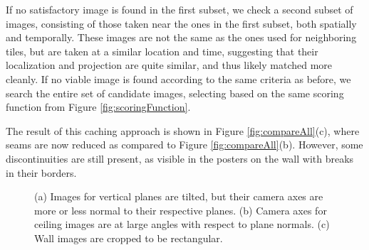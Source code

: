 \documentclass[]{spie}  %
\begin{document}
If no satisfactory image is found in the first subset, we check a
second subset of images, consisting of those taken near the ones in
the first subset, both spatially and temporally. These images are not
the same as the ones used for neighboring tiles, but are taken at a
similar location and time, suggesting that their localization and
projection are quite similar, and thus likely matched more cleanly. If
no viable image is found according to the same criteria as before, we
search the entire set of candidate images, selecting based on the same
scoring function from Figure \ref{fig:scoringFunction}.

The result of this caching approach is shown in Figure
\ref{fig:compareAll}(c), where seams are now reduced as compared to
Figure \ref{fig:compareAll}(b). However, some discontinuities are
still present, as visible in the posters on the wall with breaks in
their borders.

\begin{figure}
  \centering
  \centering
  \centering
  \caption{(a) Images for vertical planes are tilted, but their camera
    axes are more or less normal to their respective planes. (b)
    Camera axes for ceiling images are at large angles with respect to
    plane normals. (c) Wall images are cropped to be rectangular.}
  \label{fig:projectionAngles}
\end{figure}
\end{document}
